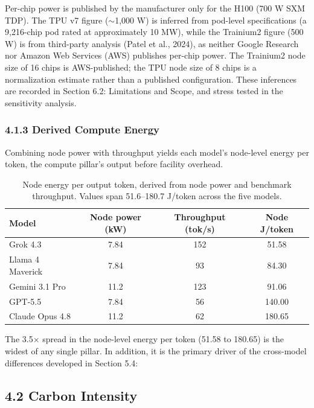 \documentclass[11pt]{article}
\begin{document}
Per-chip power is published by the manufacturer only for the H100 (700 W SXM TDP). The TPU v7 figure ($\sim$1,000 W) is inferred from pod-level specifications (a 9,216-chip pod rated at approximately 10 MW), while the Trainium2 figure (500 W) is from third-party analysis (Patel et al., 2024), as neither Google Research nor Amazon Web Services (AWS) publishes per-chip power. The Trainium2 node size of 16 chips is AWS-published; the TPU node size of 8 chips is a normalization estimate rather than a published configuration. These inferences are recorded in Section 6.2: Limitations and Scope, and stress tested in the sensitivity analysis.

\subsubsection*{4.1.3 Derived Compute Energy}

Combining node power with throughput yields each model's node-level energy per token, the compute pillar's output before facility overhead.

\begin{table}[htbp]
  \centering
  \begin{tabular}{@{}l c c c@{}}
    \toprule
    \textbf{Model} & \textbf{Node power (kW)} & \textbf{Throughput (tok/s)} & \textbf{Node J/token} \\
    \midrule
    Grok 4.3         & 7.84 & 152 & 51.58 \\
    Llama 4 Maverick & 7.84 & 93  & 84.30 \\
    Gemini 3.1 Pro   & 11.2 & 123 & 91.06 \\
    GPT-5.5          & 7.84 & 56  & 140.00 \\
    Claude Opus 4.8  & 11.2 & 62  & 180.65 \\
    \bottomrule
  \end{tabular}
  \caption{Node energy per output token, derived from node power and benchmark throughput. Values span 51.6--180.7 J/token across the five models.}
  \label{tab:derivedcompute}
\end{table}

The 3.5$\times$ spread in the node-level energy per token (51.58 to 180.65) is the widest of any single pillar. In addition, it is the primary driver of the cross-model differences developed in Section 5.4:

\subsection*{4.2 Carbon Intensity}
\end{document}
